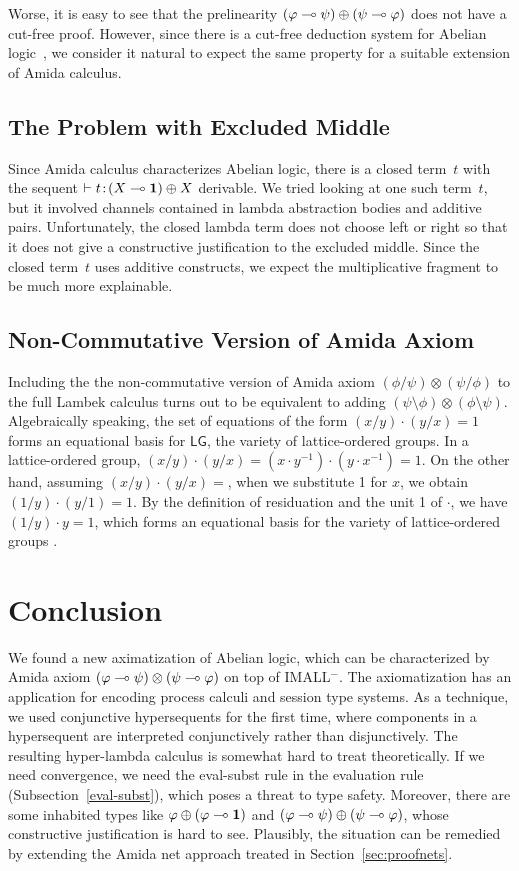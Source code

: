Worse, it is easy to see that the prelinearity
$(\varphi\multimap\psi)\oplus(\psi\multimap\varphi)$ does not have a cut-free proof.
However,
since there is a cut-free deduction system for Abelian
logic~\citep{metcalfe2006},
we consider it natural to expect the same property for a suitable
extension of Amida calculus.

\subsection{The Problem with Excluded Middle}
\label{computational-meaning}

Since Amida calculus characterizes Abelian logic,
there is a closed term~$t$ with the sequent $\vdash{t} \mathord{\colon\kern -2pt}{(X\multimap \mathbf{1})\oplus X}$
derivable.
We tried looking at one such term~$t$, but it involved channels
contained in lambda abstraction bodies and additive pairs.
Unfortunately, the closed lambda term does not choose left or right so
that it does not give a constructive justification to the excluded
middle.
Since the closed term~$t$ uses additive constructs, we expect the
multiplicative fragment to be much more explainable.

\subsection{Non-Commutative Version of Amida Axiom}

Including the
the non-commutative version of Amida axiom $(\phi/\psi)\otimes(\psi/\phi)$
to the full Lambek calculus turns out to be equivalent to
adding $(\psi\setminus\phi)\otimes(\phi\setminus\psi)$.
Algebraically speaking,
the set of equations of the form $(x/y)\cdot(y/x) = 1$ forms an
equational basis for $\mathsf{LG}$, the variety of lattice-ordered
groups.
In a lattice-ordered group,
$(x/y)\cdot (y/x) = (x \cdot y^{-1}) \cdot (y \cdot x^{-1}) = 1$.
On the other hand, assuming $(x/y)\cdot (y/x) = $, when we substitute 1
for $x$, we obtain $(1/y)\cdot (y/1) = 1$.
By the definition of residuation and the unit 1 of $\cdot$,
we have $(1/y)\cdot y = 1$, which forms an equational basis for the
variety of lattice-ordered groups \citep[Lemma~3.25]{residuated}.

\section{Conclusion}

We found a new aximatization of Abelian logic, which can be
characterized by Amida axiom
$(\varphi\multimap\psi)\otimes(\psi\multimap\varphi)$ on top of IMALL$^-$.
The axiomatization has an application for encoding process calculi and
session type systems.
As a technique, we used conjunctive hypersequents for the first time,
where components in a hypersequent are interpreted conjunctively rather
than disjunctively.
The resulting hyper-lambda calculus is somewhat hard to treat
theoretically.
If we need convergence, we need the eval-subst rule in the evaluation rule
(Subsection~\ref{eval-subst}),
which poses a threat to type safety.
Moreover, there are some inhabited types like $\varphi\oplus
(\varphi\multimap\mathbf{1})$ and $(\varphi\multimap\psi)\oplus(\psi\multimap\varphi)$,
whose constructive justification is hard to see.
Plausibly, the situation can be remedied by extending the Amida net
approach treated in Section~\ref{sec:proofnets}.
